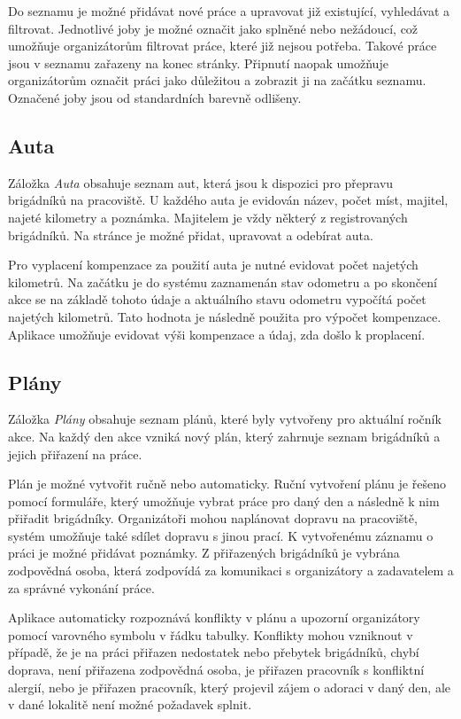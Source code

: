 Do seznamu je možné přidávat nové práce a upravovat již existující, vyhledávat a filtrovat.
Jednotlivé joby je možné označit jako splněné nebo nežádoucí, což umožňuje organizátorům filtrovat práce, které již nejsou potřeba. Takové práce jsou v seznamu
zařazeny na konec stránky. Připnutí naopak umožňuje organizátorům označit práci jako důležitou a zobrazit ji na začátku seznamu. Označené joby jsou od standardních
barevně odlišeny.

\subsection{Auta}

Záložka \textit{Auta} obsahuje seznam aut, která jsou k dispozici pro přepravu brigádníků na pracoviště. U každého auta je evidován název, počet míst, majitel,
najeté kilometry a poznámka. Majitelem je vždy některý z registrovaných brigádníků. Na stránce je možné přidat, upravovat a odebírat auta.

Pro vyplacení kompenzace za použití auta je nutné evidovat počet najetých kilometrů. Na začátku je do systému zaznamenán stav odometru a po skončení akce
se na základě tohoto údaje a aktuálního stavu odometru vypočítá počet najetých kilometrů. Tato hodnota je následně použita pro výpočet kompenzace. Aplikace 
umožňuje evidovat výši kompenzace a údaj, zda došlo k proplacení.

\subsection{Plány}

Záložka \textit{Plány} obsahuje seznam plánů, které byly vytvořeny pro aktuální ročník akce. Na každý den akce vzniká nový plán, který zahrnuje
seznam brigádníků a jejich přiřazení na práce.

Plán je možné vytvořit ručně nebo automaticky. Ruční vytvoření plánu je řešeno pomocí formuláře, který umožňuje vybrat práce pro daný den a následně 
k nim přiřadit brigádníky. Organizátoři mohou naplánovat dopravu na pracoviště, systém umožňuje také sdílet dopravu s jinou prací. K vytvořenému záznamu
o práci je možné přidávat poznámky. Z přiřazených brigádníků je vybrána zodpovědná osoba, která zodpovídá za komunikaci s organizátory a zadavatelem a za správné vykonání práce.

Aplikace automaticky rozpoznává konflikty v plánu a upozorní organizátory pomocí varovného symbolu v řádku tabulky.
Konflikty mohou vzniknout v případě, že je na práci přiřazen nedostatek nebo přebytek brigádníků, 
chybí doprava, není přiřazena zodpovědná osoba, je přiřazen pracovník s konfliktní alergií, nebo je přiřazen pracovník, který projevil zájem o adoraci v daný den,
ale v dané lokalitě není možné požadavek splnit.

